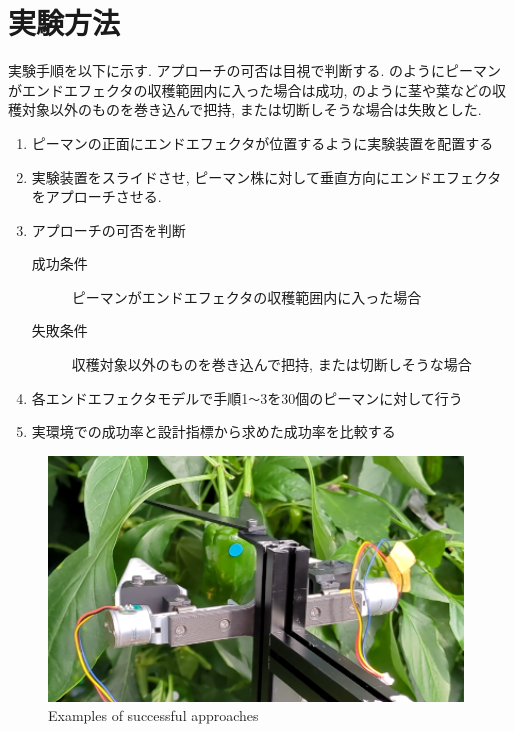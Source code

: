 \section{実験方法}
実験手順を以下に示す. アプローチの可否は目視で判断する.
のようにピーマンがエンドエフェクタの収穫範囲内に入った場合は成功, のように茎や葉などの収穫対象以外のものを巻き込んで把持, または切断しそうな場合は失敗とした.
\begin{enumerate}
  \item ピーマンの正面にエンドエフェクタが位置するように実験装置を配置する
  \item 実験装置をスライドさせ, ピーマン株に対して垂直方向にエンドエフェクタをアプローチさせる.
  \item アプローチの可否を判断
  \begin{description}
    \item[成功条件] ピーマンがエンドエフェクタの収穫範囲内に入った場合
    \item[失敗条件] 収穫対象以外のものを巻き込んで把持, または切断しそうな場合
  \end{description}
  \item 各エンドエフェクタモデルで手順1\verb|〜|3を30個のピーマンに対して行う
  \item 実環境での成功率と設計指標から求めた成功率を比較する
\end{enumerate}

\vspace{5mm}
\begin{figure}[H]
     \centering
     \includegraphics[width=110mm]{images/png/success.png}
     \caption{Examples of successful approaches}
     \label{Fig:success}
   \end{figure}

